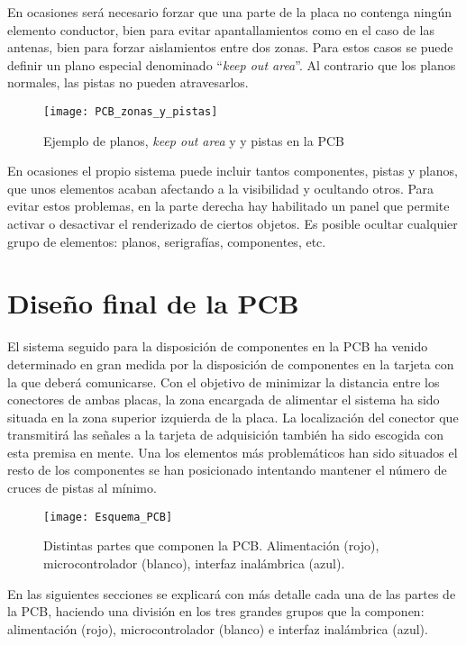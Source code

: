 En ocasiones será necesario forzar que una parte de la placa no contenga ningún elemento conductor, bien para evitar apantallamientos como en el caso de las antenas, bien para forzar aislamientos entre dos zonas. Para estos casos se puede definir un plano especial denominado ``\textit{keep out area}''. Al contrario que los planos normales, las pistas no pueden atravesarlos.

\begin{figure} [H]
    \centering
    \texttt{[image: PCB\_zonas\_y\_pistas]}
    \caption{Ejemplo de planos, \textit{keep out area} y y pistas en la PCB}
    \label{fig:PCB_zonas_y_pistas}
\end{figure}

En ocasiones el propio sistema puede incluir tantos componentes, pistas y planos, que unos elementos acaban afectando a la visibilidad y ocultando otros. Para evitar estos problemas, en la parte derecha hay habilitado un panel que permite activar o desactivar el renderizado de ciertos objetos. Es posible ocultar cualquier grupo de elementos: planos, serigrafías, componentes, etc.
 
\clearpage 
 
\section{Diseño final de la PCB\label{sec:PCB_final}}

El sistema seguido para la disposición de componentes en la \acrshort{PCB} ha venido determinado en gran medida por la disposición de componentes en la tarjeta con la que deberá comunicarse. Con el objetivo de minimizar la distancia entre los conectores de ambas placas, la zona encargada de alimentar el sistema ha sido situada en la zona superior izquierda de la placa. La localización del conector que transmitirá las señales a la tarjeta de adquisición también ha sido escogida con esta premisa en mente. Una los elementos más problemáticos han sido situados el resto de los componentes se han posicionado intentando mantener el número de cruces de pistas al mínimo.

\begin{figure} [H]
    \centering
    \texttt{[image: Esquema\_PCB]}
    \caption{Distintas partes que componen la PCB. Alimentación (rojo), microcontrolador (blanco), interfaz inalámbrica (azul).}
    \label{fig:Esquema_PCB}
\end{figure}

En las siguientes secciones se explicará con más detalle cada una de las partes de la \acrshort{PCB}, haciendo una división en los tres grandes grupos que la componen: alimentación (rojo), microcontrolador (blanco) e interfaz inalámbrica (azul).

